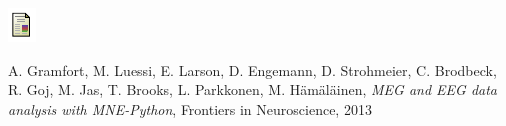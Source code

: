 \documentclass[t,11pt,compress]{beamer} %
\newcommand{\vfillll}{\vfilll\vfilll\vfilll\vfilll\vfilll\vfilll\vfilll\vfilll\vfilll\vfilll\vfilll\vfilll\vfilll\vfilll\vfilll\vfilll\vfilll\vfilll\vfilll\vfilll\vfilll\vfilll\vfilll\vfilll\vfilll\vfilll\vfilll\vfilll\vfilll\vfilll\vfilll\vfilll\vfilll\vfilll\vfilll\vfilll\vfilll\vfilll\vfilll\vfilll}
\begin{document}
\begin{frame}[plain,t,c]
\begin{minipage}{\linewidth}
\begin{minipage}{0.05\linewidth}
    \includegraphics[width=0.9\linewidth]{paper_logo.pdf}%
\end{minipage}
\begin{minipage}{0.93\linewidth}
    A. Gramfort, M. Luessi, E. Larson, D. Engemann, D. Strohmeier, C. Brodbeck, R. Goj, M. Jas, T. Brooks, L. Parkkonen, M. H\"am\"al\"ainen,
    \emph{MEG and EEG data analysis with MNE-Python}, Frontiers in Neuroscience, 2013
\end{minipage}
\end{minipage}




\end{frame}
\end{document}
